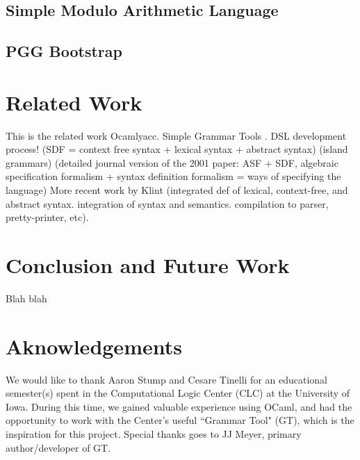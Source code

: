 \documentclass[10pt]{article}
\begin{document}
\subsection{Simple Modulo Arithmetic Language}
\subsection{PGG Bootstrap}

\section{Related Work}
This is the related work
\cite{ocamlyacc} Ocamlyacc.
Simple Grammar Tools
\cite{uiowa_gt} \cite{noonan_grammar}.
\cite{visser2008webdsl} DSL development process!
\cite{heering1989syntax} (SDF = context free syntax + lexical syntax + abstract syntax)
\cite{moonen2001generating} (island grammars)
\cite{klint1993meta} (detailed journal version of the 2001 paper: ASF + SDF, algebraic specification formalism + syntax definition formalism = ways of specifying the language)
\cite{klint2011easy} More recent work by Klint
\cite{van2001sf} (integrated def of lexical, context-free, and abstract syntax.  integration of syntax and semantics. compilation to parser, pretty-printer, etc).

\section{Conclusion and Future Work}
Blah blah

\section{Aknowledgements}
We would like to thank Aaron Stump and Cesare Tinelli for an educational
semester(s) spent in the Computational Logic Center (CLC) at the University of Iowa.
During this time, we gained valuable experience using OCaml, and had the opportunity
to work with the Center's useful ``Grammar Tool" (GT), which is the inspiration for this project.
Special thanks goes to JJ Meyer, primary author/developer of GT.



\end{document}
